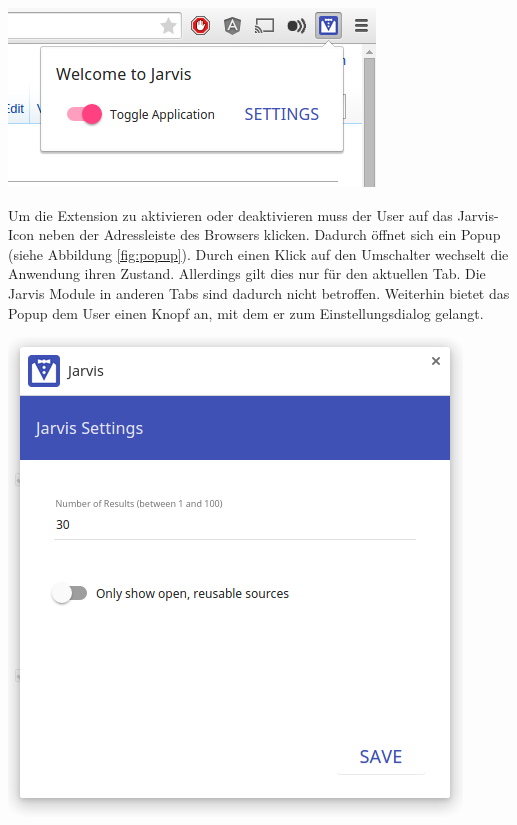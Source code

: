  \begin{minipage}{\linewidth}
	\centering
	\vspace*{0.5cm}
	\includegraphics[scale=0.6]{Bilder/app-screenshots/popup.png}
	\label{fig:popup}
	\vspace*{0.5cm}
 \end{minipage}

 Um die Extension zu aktivieren oder deaktivieren muss der User auf das Jarvis-Icon neben der Adressleiste des Browsers klicken. Dadurch öffnet sich ein Popup (siehe Abbildung \ref{fig:popup}). Durch einen Klick auf den Umschalter wechselt die Anwendung ihren Zustand. Allerdings gilt dies nur für den aktuellen Tab. Die Jarvis Module in anderen Tabs sind dadurch nicht betroffen. Weiterhin bietet das Popup dem User einen Knopf an, mit dem er zum Einstellungsdialog gelangt.

 \begin{minipage}{\linewidth}
	\centering
	\vspace*{0.5cm}
	\includegraphics[scale=0.5]{Bilder/app-screenshots/settings.png}
	\label{fig:settings}
	\vspace*{0.5cm}
 \end{minipage}

